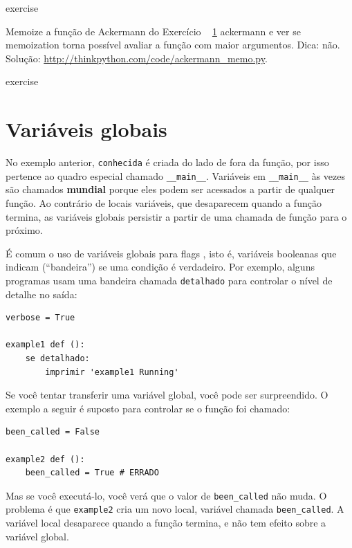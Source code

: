 \documentclass[10pt]{book}
\begin{document}
\begin{exercise}
\begin{v erbatim}
\begin{} exercise

Memoize a função de Ackermann do Exercício ~ \ref {} ackermann e ver se
memoization torna possível avaliar a função com maior
argumentos. Dica: não.
Solução: \url{http://thinkpython.com/code/ackermann_memo.py}.

\end{} exercise


\section{Variáveis ​​globais}

No exemplo anterior, {\tt conhecida} é criada do lado de fora da função,
por isso pertence ao quadro especial chamado \verb "__main__".
Variáveis ​​em \verb "__main__" às vezes são chamados {\bf mundial}
porque eles podem ser acessados ​​a partir de qualquer função. Ao contrário de locais
variáveis, que desaparecem quando a função termina, as variáveis ​​globais
persistir a partir de uma chamada de função para o próximo.

É comum o uso de variáveis ​​globais para {flags \bf}, isto é, 
variáveis ​​booleanas que indicam (``bandeira'') se uma condição
é verdadeiro. Por exemplo, alguns programas usam
uma bandeira chamada {\tt detalhado} para controlar o nível de detalhe no
saída:

\begin{verbatim}
verbose = True

example1 def ():
    se detalhado:
        imprimir 'example1 Running'
\end{verbatim}
%
Se você tentar transferir uma variável global, você pode ser surpreendido.
O exemplo a seguir é suposto para controlar se o
função foi chamado:

\begin{verbatim}
been_called = False

example2 def ():
    been_called = True # ERRADO
\end{verbatim}
%
Mas se você executá-lo, você verá que o valor de \verb "been_called"
não muda. O problema é que {\tt example2} cria um novo local,
variável chamada \verb "been_called". A variável local desaparece quando
a função termina, e não tem efeito sobre a variável global.


\end{v erbatim}
\end{exercise}
\end{document}
